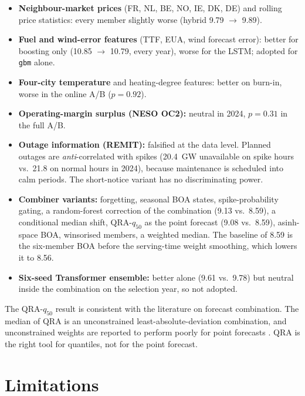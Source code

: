 \documentclass[11pt,a4paper]{article}
\begin{document}
\begin{itemize}
\item \textbf{Neighbour-market prices} (FR, NL, BE, NO, IE, DK, DE) and rolling price statistics: every member slightly worse (hybrid 9.79 $\to$ 9.89).
\item \textbf{Fuel and wind-error features} (TTF, EUA, wind forecast error): better for boosting only (10.85 $\to$ 10.79, every year), worse for the LSTM; adopted for \texttt{gbm} alone.
\item \textbf{Four-city temperature} and heating-degree features: better on burn-in, worse in the online A/B ($p=0.92$).
\item \textbf{Operating-margin surplus (NESO OC2):} neutral in 2024, $p=0.31$ in the full A/B.
\item \textbf{Outage information (REMIT):} falsified at the data level. Planned outages are \emph{anti}-correlated with spikes (20.4~GW unavailable on spike hours vs.\ 21.8 on normal hours in 2024), because maintenance is scheduled into calm periods. The short-notice variant has no discriminating power.
\item \textbf{Combiner variants:} forgetting, seasonal BOA states, spike-probability gating, a random-forest correction of the combination (9.13 vs.\ 8.59), a conditional median shift, QRA-$q_{50}$ as the point forecast (9.08 vs.\ 8.59), asinh-space BOA, winsorised members, a weighted median. The baseline of 8.59 is the six-member BOA before the serving-time weight smoothing, which lowers it to 8.56.
\item \textbf{Six-seed Transformer ensemble:} better alone (9.61 vs.\ 9.78) but neutral inside the combination on the selection year, so not adopted.
\end{itemize}

The QRA-$q_{50}$ result is consistent with the literature on forecast combination. The median of QRA is an unconstrained least-absolute-deviation combination, and unconstrained weights are reported to perform poorly for point forecasts \citep{weron2014,nowotarski2016}. QRA is the right tool for quantiles, not for the point forecast.

\section{Limitations}
\end{document}
